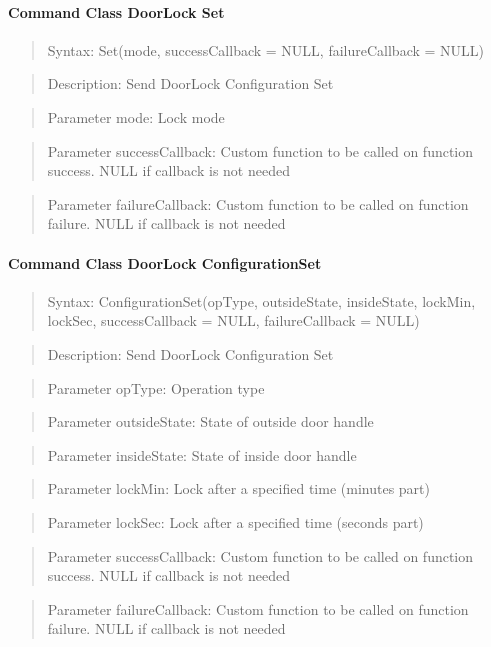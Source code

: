\paragraph {Command Class DoorLock Set}
\begin{quote} Syntax: Set(mode, successCallback = NULL, failureCallback = NULL)\end{quote}
\begin{quote} Description: Send DoorLock Configuration Set\end{quote}
\begin{quote} Parameter mode: Lock mode\end{quote}
\begin{quote} Parameter successCallback: Custom function to be called on function success. NULL if callback is not needed\end{quote}
\begin{quote} Parameter failureCallback: Custom function to be called on function failure. NULL if callback is not needed\end{quote}

\paragraph {Command Class DoorLock ConfigurationSet}
\begin{quote} Syntax: ConfigurationSet(opType, outsideState, insideState, lockMin, lockSec, successCallback = NULL, failureCallback = NULL)\end{quote}
\begin{quote} Description: Send DoorLock Configuration Set\end{quote}
\begin{quote} Parameter opType: Operation type\end{quote}
\begin{quote} Parameter outsideState: State of outside door handle\end{quote}
\begin{quote} Parameter insideState: State of inside door handle\end{quote}
\begin{quote} Parameter lockMin: Lock after a specified time (minutes part)\end{quote}
\begin{quote} Parameter lockSec: Lock after a specified time (seconds part)\end{quote}
\begin{quote} Parameter successCallback: Custom function to be called on function success. NULL if callback is not needed\end{quote}
\begin{quote} Parameter failureCallback: Custom function to be called on function failure. NULL if callback is not needed\end{quote}

